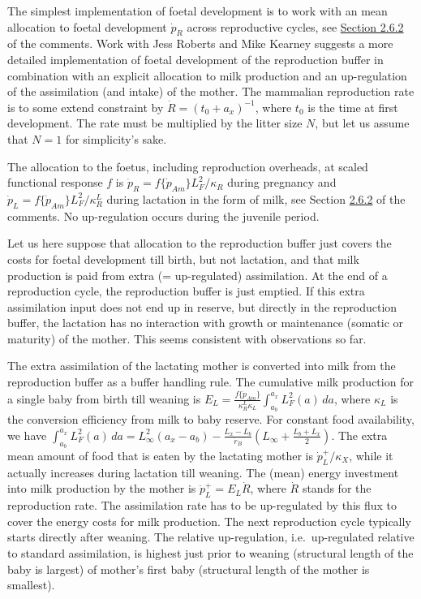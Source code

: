 The simplest implementation of foetal development is to work with an mean allocation to foetal development $\dot{p}_R$ across reproductive cycles, see \hyperref[ssec_c_c:birth]{Section 2.6.2} of the comments.
Work with Jess Roberts and Mike Kearney suggests a more detailed implementation of foetal development of the reproduction buffer in combination with an explicit allocation to milk production and an up-regulation of the assimilation (and intake) of the mother.
The mammalian reproduction rate is to some extend constraint by $\dot{R} = (t_0 + a_x)^{-1}$, where $t_0$ is the time at first development.
The rate must be multiplied by the litter size $N$, but let us assume that $N = 1$ for simplicity's sake.

The allocation to the foetus, including reproduction overheads, at scaled functional response $f$ is $\dot{p}_R = f \{\dot{p}_{Am}\} L_F^2/ \kappa_R$ during pregnancy and $\dot{p}_L = f \{\dot{p}_{Am}\} L_F^2/ \kappa_R^L$ during lactation in the form of milk, see Section \hyperref[ssec_c_c:birth]{2.6.2} of the comments.
No up-regulation occurs during the juvenile period. 

Let us here suppose that allocation to the reproduction buffer just covers the costs for foetal development till birth, but not lactation, and that milk production is paid from extra (= up-regulated) assimilation.
At the end of a reproduction cycle, the reproduction buffer is just emptied.
If this extra assimilation input does not end up in reserve, but directly in the reproduction buffer, the lactation has no interaction with growth or maintenance (somatic or maturity) of the mother.
This seems consistent with observations so far.

The extra assimilation of the lactating mother is converted into milk from the reproduction buffer as a buffer handling rule. 
The cumulative milk production for a single baby from birth till weaning is $E_L = \frac{f \{\dot{p}_{Am}\}} {\kappa_R^L \kappa_L} \int_{a_b}^{a_x} L_F^2(a) \, da$, where $\kappa_L$ is the conversion efficiency from milk to baby reserve.
For constant food availability, we have $\int_{a_b}^{a_x} L_F^2(a) \, da = L_\infty^2 (a_x - a_b) - \frac{L_x - L_b} {\dot{r}_B} \left( L_\infty + \frac{L_b + L_x} {2} \right)$.
The extra mean amount of food that is eaten by the lactating mother is $\dot{p}_L^+/ \kappa_X$, while it actually increases during lactation till weaning.
The (mean) energy investment into milk production by the mother is $\dot{p}_L^+ = E_L \dot{R}$, where $\dot{R}$ stands for the reproduction rate.
The assimilation rate has to be up-regulated by this flux to cover the energy costs for milk production.
The next reproduction cycle typically starts directly after weaning.
The relative up-regulation, i.e.\ up-regulated relative to standard assimilation, is highest just prior to weaning (structural length of the baby is largest) of mother's first baby (structural length of the mother is smallest).


